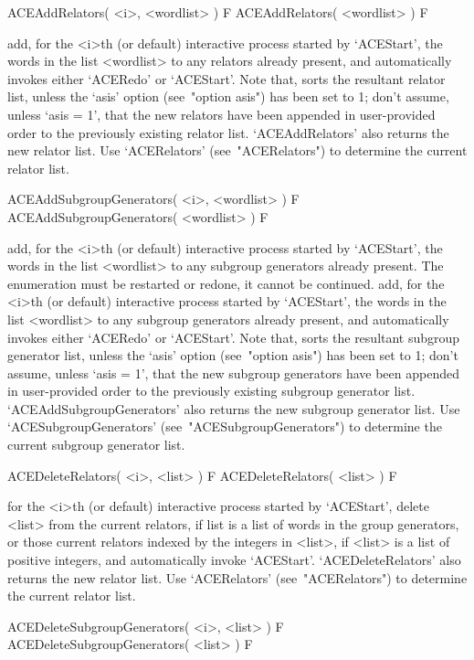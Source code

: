\>ACEAddRelators( <i>, <wordlist> ) F
\>ACEAddRelators( <wordlist> ) F

add, for the <i>th (or default) interactive {\ACE} process started  by
`ACEStart', the words in the list <wordlist> to any  relators  already
present, and automatically invokes  either  `ACERedo'  or  `ACEStart'.
Note that, {\ACE} sorts the resultant relator list, unless the  `asis'
option (see~"option asis") has been set to  1;  don't  assume,  unless
`asis = 1', that the new relators have been appended in  user-provided
order to the previously existing relator list.  `ACEAddRelators'  also
returns the new relator list. Use `ACERelators' (see~"ACERelators") to
determine the current relator list.

\>ACEAddSubgroupGenerators( <i>, <wordlist> ) F
\>ACEAddSubgroupGenerators( <wordlist> ) F

add, for the <i>th (or default) interactive {\ACE} process started  by
`ACEStart',  the  words  in  the  list  <wordlist>  to  any   subgroup
generators already present.  The  enumeration  must  be  restarted  or
redone, it cannot be  continued.  add,  for  the  <i>th  (or  default)
interactive {\ACE} process started by `ACEStart',  the  words  in  the
list <wordlist>  to  any  subgroup  generators  already  present,  and
automatically invokes  either  `ACERedo'  or  `ACEStart'.  Note  that,
{\ACE} sorts the resultant subgroup generator list, unless the  `asis'
option (see~"option asis") has been set to  1;  don't  assume,  unless
`asis = 1', that the new subgroup generators  have  been  appended  in
user-provided order to  the  previously  existing  subgroup  generator
list.  `ACEAddSubgroupGenerators'  also  returns  the   new   subgroup
generator          list.          Use          `ACESubgroupGenerators'
(see~"ACESubgroupGenerators")  to  determine  the   current   subgroup
generator list.

\>ACEDeleteRelators( <i>, <list> ) F
\>ACEDeleteRelators( <list> ) F

for the <i>th (or  default)  interactive  {\ACE}  process  started  by
`ACEStart', delete <list> from the current relators, if list is a list
of words in the group generators, or those current relators indexed by
the integers in <list>, if <list> is a list of positive integers,  and
automatically invoke `ACEStart'. `ACEDeleteRelators' also returns  the
new relator list. Use `ACERelators' (see~"ACERelators")  to  determine
the current relator list.

\>ACEDeleteSubgroupGenerators( <i>, <list> ) F
\>ACEDeleteSubgroupGenerators( <list> ) F

